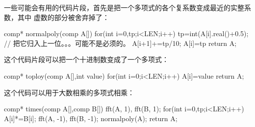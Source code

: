 一些可能会有用的代码片段，首先是把一个多项式的各个复系数变成最近的实整系数，其中
虚数的部分被舍弃掉了：
\begin{Cpp}
comp* normalpoly(comp A[]){
  for(int i=0,tp;i<LEN;i++){
    tp=int(A[i].real()+0.5);
    // 把它归入上一位。。。可能不是必须的。
    A[i+1]+=tp/10;
    A[i]=tp%
  }
  return A;
}
\end{Cpp}

这个代码片段可以把一个十进制数变成了一个多项式：
\begin{Cpp}
comp* toploy(comp A[],int value){
  for(int i=0;i<LEN;i++)
    A[i]=value%
  return A;
}
\end{Cpp}

这个代码可以用于大数相乘的多项式相乘：
\begin{Cpp}
comp* times(comp A[],comp B[]){
  fft(A, 1), fft(B, 1);
  for(int i=0,tp;i<LEN;i++)
    A[i]*=B[i];
  fft(A, -1), fft(B, -1);
  normalpoly(A);
  return A;
}
\end{Cpp}
